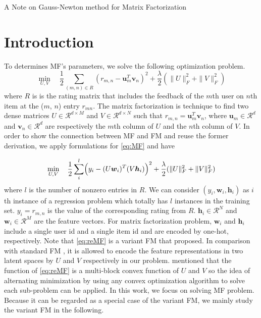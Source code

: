 \documentclass[11pt,twoside]{article}
\newcommand{\bsym}[1]{\ensuremath{\boldsymbol{#1}}}
\newcommand{\bw}{\ensuremath{\bsym{w}}}
\newcommand{\bh}{\ensuremath{\bsym{h}}}
\newcommand{\bu}{\ensuremath{\bsym{u}}}
\newcommand{\bv}{\ensuremath{\bsym{v}}}
\newcommand{\bbr}{\ensuremath{\mathcal R}}
\begin{document}
\begin{center}
    {\Large A Note on Gauss-Newton method for Matrix Factorization}
\end{center}


\section{Introduction}
To determines MF's parameters, we solve the following optimization problem.
\begin{equation}
    \min_{U,V} \quad \frac{1}{2}\sum_{(m, n) \in R}  (r_{m,n} - \bu_m^T \bv_n)^2+
    \frac{\lambda}{2} (\|U\|^2_F + \|V\|^2_F	)
    \label{eq:MF}
\end{equation}
where
$R$ is is the rating matrix that includes the feedback of the $m$th user on $n$th item at the ($m$, $n$) entry $r_{m n}$. The matrix factorization is technique to find two dense matrices $U \in \bbr^{d \times M}$ and $V \in \bbr^{d \times N}$ such that $r_{m,n} = \bu_m^T\bv_n$, where $\bu_m \in \bbr^d$ and $\bv_n \in \bbr^d$ are respectively the $m$th column of $U$ and the $n$th column of $V$.  In order to show the connection between MF and FM and reuse the former derivation, we apply formulations for \eqref{eq:MF} and have

\begin{equation}
    \min_{U,V}  \quad \frac{1}{2}\sum_{i}^l  \Bigl(y_i - (U \bw_i)^T (V \bh_i)\Bigr)^2+
    \frac{\lambda}{2} (\|U\|^2_F +\|V\|^2_F	)
    \label{eq:reMF}
\end{equation}
where $l$ is the number of nonzero entries in $R$. We can consider $(y_i, \bw_i, \bh_i)$ as $i$th instance of a regression problem which totally has $l$ instances in the training set.
$y_i=r_{m, n}$ is the value of the corresponding rating from $R$. $\bh_i \in \bbr^N $ and $\bw_i \in \bbr^M$ are the feature vectors. For matrix factorization problem, $\bw_i$ and $\bh_i$  include a single user id and a single item id and are encoded by one-hot, respectively.  
Note that \eqref{eq:reMF} is a variant FM that \citet{MB16a} proposed. 
In comparison with standard FM \citep{SR10c}, 
it is allowed to encode the feature representations in two latent spaces by $U$ and $V$ respectively in our problem. 
\citet{MB16a} mentioned that the function of \eqref{eq:reMF} is a multi-block convex function of $U$ and $V$ so the idea of alternating minimization by using any convex optimization algorithm to solve each sub-problem can be applied. In this work, we focus on solving MF problem. Because it can be regarded as a special case of the variant FM, we mainly study the variant FM in the following.
\end{document}
